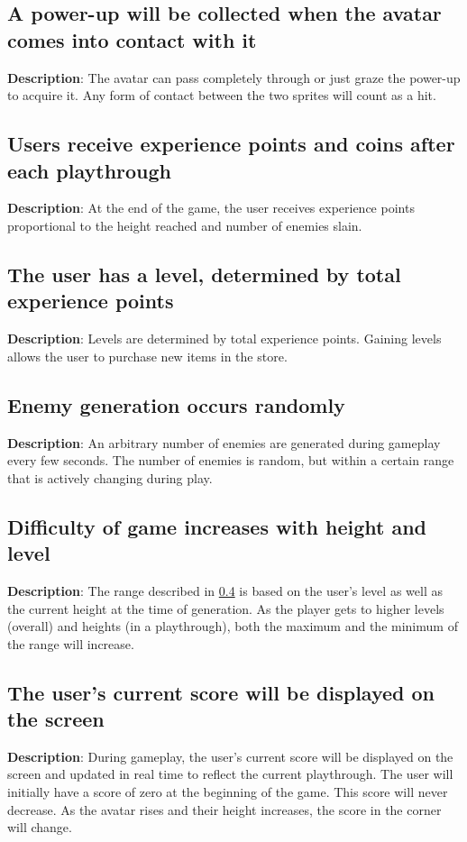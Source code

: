 \subsection{A power-up will be collected when the avatar comes into 
contact with it}
\textbf{Description}: The avatar can pass completely through or just
graze the power-up to acquire it. Any form of contact between the
two sprites will count as a hit.

\subsection{Users receive experience points and coins after each playthrough}
\textbf{Description}: At the end of the game, the user receives experience
points proportional to the height reached and number of enemies slain.

\subsection{The user has a level, determined by total experience points}
\textbf{Description}: Levels are determined by total experience points.
Gaining levels allows the user to purchase new items in the store.

\subsection{Enemy generation occurs randomly}
\label{GAME-16}
\textbf{Description}: An arbitrary number of enemies are generated
during gameplay every few seconds. The number of enemies is random,
but within a certain range that is actively changing during play. 

\subsection{Difficulty of game increases with height and level}
\textbf{Description}: The range described in \ref{GAME-16} is based on the
user\textquoteright{}s level as well as the current height at the
time of generation. As the player gets to higher levels (overall)
and heights (in a playthrough), both the maximum and the minimum of
the range will increase.

\subsection{The user\textquoteright{}s current score will be displayed
on the screen}
\textbf{Description}: During gameplay, the user\textquoteright{}s
current score will be displayed on the screen and updated in real
time to reflect the current playthrough. The user will initially have
a score of zero at the beginning of the game. This score will never
decrease. As the avatar rises and their height increases, the score
in the corner will change. 

